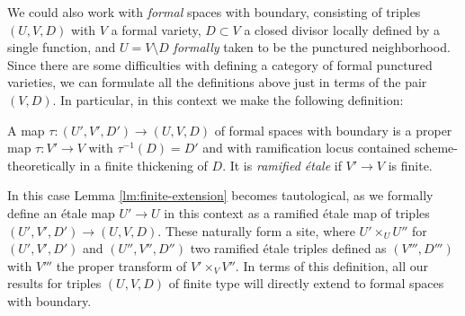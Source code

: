 \documentclass{article}
\begin{document}
We could also work with \emph{formal} spaces with boundary, consisting of triples $(U, V, D)$ with $V$ a formal variety, $D\subset V$ a closed divisor locally defined by a single function, and $U = V\setminus D$ \emph{formally} taken to be the punctured neighborhood. Since there are some difficulties with defining a category of formal punctured varieties, we can formulate all the definitions above just in terms of the pair $(V, D)$. In particular, in this context we make the following definition:
\begin{defi}
  A map $\tau:(U', V', D')\to (U, V, D)$ of formal spaces with boundary is a proper map $\tau:V'\to V$ with $\tau^{-1}(D) = D'$ and with ramification locus contained scheme-theoretically in a finite thickening of $D$. It is \emph{ramified \'etale} if $V'\to V$ is finite. 
\end{defi}
In this case Lemma \ref{lm:finite-extension} becomes tautological, as we formally define an \'etale map $U'\to U$ in this context as a ramified \'etale map of triples $(U', V', D')\to (U, V, D).$ These naturally form a site, where $U'\times_U U''$ for $(U', V', D')$ and $(U'', V'', D'')$ two ramified \'etale triples defined as $(V''', D''')$ with $V'''$ the proper transform of $V'\times_V V''$. In terms of this definition, all our results for triples $(U, V, D)$ of finite type will directly extend to formal spaces with boundary.
\end{document}
